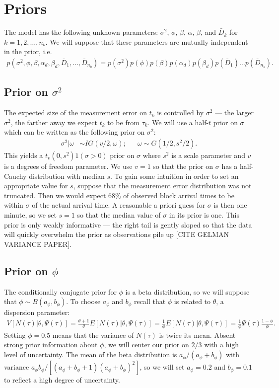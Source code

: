 \documentclass{article}
\begin{document}
\section{Priors}
The model has the following unknown parameters: $\sigma^2$, $\phi$, $\beta$, $\alpha$, $\beta$, and $\bar{D}_k$ for $k=1,2,\dots,n_b$. We will suppose that these parameters are mutually independent in the prior, i.e.
\begin{align*}
p(\sigma^2,\phi,\beta,\alpha_d,\beta_d,\bar{D}_1,\dots,\bar{D}_{n_{b}}) = p(\sigma^2)p(\phi)p(\beta)p(\alpha_d)p(\beta_d)p(\bar{D}_1)\hdots p(\bar{D}_{n_{b}}).
\end{align*}

\subsection{Prior on $\sigma^2$}
The expected size of the measurement error on $t_k$ is controlled by $\sigma^2$ --- the larger $\sigma^2$, the farther away we expect $t_k$ to be from $\tau_k$. We will use a half-$t$ prior on $\sigma$ which can be written as the following prior on $\sigma^2$:
\begin{align*}
\sigma^2|\omega &\sim IG(v/2, \omega); && \omega \sim G(1/2, s^2/2).
\end{align*}
This yields a $t_{v}(0,s^2)1(\sigma>0)$ prior on $\sigma$ where $s^2$ is a scale parameter and $v$ is a degrees of freedom parameter. We use $v=1$ so that the prior on $\sigma$ has a half-Cauchy distribution with median $s$. To gain some intuition in order to set an appropriate value for $s$, suppose that the measurement error distribution was not truncated. Then we would expect $68\%$ of observed block arrival times to be within $\sigma$ of the actual arrival time. A reasonable a priori guess for $\sigma$ is then one minute, so we set $s=1$ so that the median value of $\sigma$ in its prior is one. This prior is only weakly informative --- the right tail is gently sloped so that the data will quickly overwhelm the prior as observations pile up [CITE GELMAN VARIANCE PAPER]. 

\subsection{Prior on $\phi$}
The conditionally conjugate prior for $\phi$ is a beta distribution, so we will suppose that $\phi \sim B(a_{\phi}, b_{\phi})$. To choose $a_\phi$ and $b_\phi$ recall that $\phi$ is related to $\theta$, a dispersion parameter:
\begin{align*}
V[N(\tau)|\theta,\Psi(\tau)] = \frac{\theta + 1}{\theta}E[N(\tau)|\theta,\Psi(\tau)] = \frac{1}{\phi}E[N(\tau)|\theta,\Psi(\tau)] = \frac{1}{\phi}\Psi(\tau)\frac{1-\phi}{\phi}.
\end{align*}
Setting $\phi = 0.5$ means that the variance of $N(\tau)$ is twice its mean. Absent strong prior information about $\phi$, we will center our prior on $2/3$ with a high level of uncertainty. The mean of the beta distribution is $a_\phi/(a_\phi + b_\phi)$ with variance $a_\phi b_\phi/[(a_\phi + b_\phi + 1)(a_\phi + b_\phi)^2]$, so we will set $a_\phi = 0.2$ and $b_\phi = 0.1$ to reflect a high degree of uncertainty.
\end{document}
